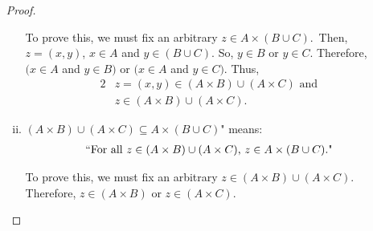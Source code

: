 \documentclass{article}
\begin{document}
\begin{enumerate}
\begin{proof}
\begin{enumerate}[i.]
                         To prove this, we must fix an arbitrary $z \in A \times (B \cup C)$.\ Then, $z = (x, y)$, $x \in A$ and $y \in (B \cup C)$. So, $y \in B$ or $y \in C$. Therefore, $(x \in A$ and $y \in B)$ or $(x \in A$ and $y \in C)$. Thus, 
                         \begin{alignat*}{2}
                             &z = (x,y) \in (A \times B) \cup (A \times C) \text{ and} \\
                             &z \in (A \times B) \cup (A \times C)\text{.}
                         \end{alignat*}
                         
                     \item \lQuote $(A \times B) \cup (A \times C) \subseteq A \times (B \cup C)$" means:
                        \begin{align*}
                            `` \text{For all } z \in (A \times B) \cup (A \times C)\text{, } z \in A \times (B \cup C)\text{."}
                        \end{align*}

                        To prove this, we must fix an arbitrary $z \in (A \times B) \cup (A \times C)$. Therefore, $z \in (A \times B)$ or $z \in (A \times C)$.
                        \begin{caseof}
                        \end{caseof}
                \end{enumerate}


\end{proof}
\end{enumerate}
\end{document}
